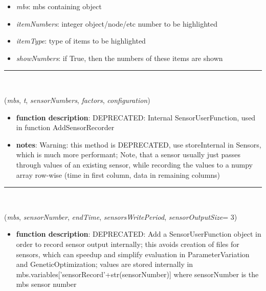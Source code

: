 \begin{itemize}[leftmargin=1.4cm]
\begin{itemize}[leftmargin=1.4cm]
\begin{itemize}[leftmargin=1.4cm]
\begin{itemize}[leftmargin=0.5cm]
\begin{itemize}[leftmargin=0.7cm]
\begin{itemize}[leftmargin=1.2cm]
\item[]{\it mbs}: mbs containing object
\item[]{\it itemNumbers}: integer object/node/etc number to be highlighted
\item[]{\it itemType}: type of items to be highlighted
\item[]{\it showNumbers}: if True, then the numbers of these items are shown
\end{itemize}
\vspace{12pt}\end{itemize}
%
\noindent\rule{8cm}{0.75pt}\vspace{1pt} \\ 
\begin{flushleft}
\label{sec:basicUtilities:UFsensorRecord}
({\it mbs}, {\it t}, {\it sensorNumbers}, {\it factors}, {\it configuration})
\end{flushleft}
\setlength{\itemindent}{0.7cm}
\begin{itemize}[leftmargin=0.7cm]
\item[--]
{\bf function description}: DEPRECATED: Internal SensorUserFunction, used in function AddSensorRecorder
\item[--]
{\bf notes}: Warning: this method is DEPRECATED, use storeInternal in Sensors, which is much more performant; Note, that a sensor usually just passes through values of an existing sensor, while recording the values to a numpy array row-wise (time in first column, data in remaining columns)
\vspace{12pt}\end{itemize}
%
\noindent\rule{8cm}{0.75pt}\vspace{1pt} \\ 
\begin{flushleft}
\label{sec:basicUtilities:AddSensorRecorder}
({\it mbs}, {\it sensorNumber}, {\it endTime}, {\it sensorsWritePeriod}, {\it sensorOutputSize}= 3)
\end{flushleft}
\setlength{\itemindent}{0.7cm}
\begin{itemize}[leftmargin=0.7cm]
\item[--]
{\bf function description}: DEPRECATED: Add a SensorUserFunction object in order to record sensor output internally; this avoids creation of files for sensors, which can speedup and simplify evaluation in ParameterVariation and GeneticOptimization; values are stored internally in mbs.variables['sensorRecord'+str(sensorNumber)] where sensorNumber is the mbs sensor number

\end{itemize}
\end{itemize}
\end{itemize}
\end{itemize}
\end{itemize}
